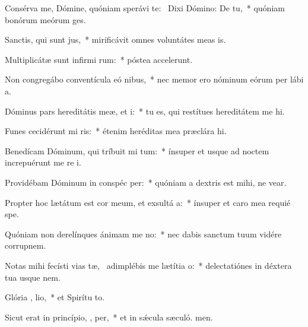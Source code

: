 \item Consérva me, Dómine, quóniam sperávi  te:~\pscross{} Dixi Dómino: De   tu,~* quóniam bonórum meórum  ges.
\item Sanctis, qui sunt   jus,~* mirificávit omnes voluntátes meas  is.
\item Multiplicátæ sunt infirmi rum:~* póstea accelerunt.
\item Non congregábo conventícula eó  nibus,~* nec memor ero nóminum eórum per lábi a.
\item Dóminus pars hereditátis meæ, et  i:~* tu es, qui restítues hereditátem me hi.
\item Funes cecidérunt mi  ris:~* étenim heréditas mea præclára  hi.
\item Benedícam Dóminum, qui tríbuit mi tum:~* ínsuper et usque ad noctem increpuérunt me re i.
\item Providébam Dóminum in conspéc  per:~* quóniam a dextris est mihi, ne vear.
\item Propter hoc lætátum est cor meum, et exsultá  a:~* ínsuper et caro mea requié  spe.
\item Quóniam non derelínques ánimam me  no:~* nec dabis sanctum tuum vidére corrupnem.
\item Notas mihi fecísti vias tæ,~\pscross{} adimplébis me lætítia   o:~* delectatiónes in déxtera tua usque  nem.
\item Glória ,  lio,~* et Spirítu to.
\item Sicut erat in princípio,  ,  per,~* et in sǽcula sæculó. men.
